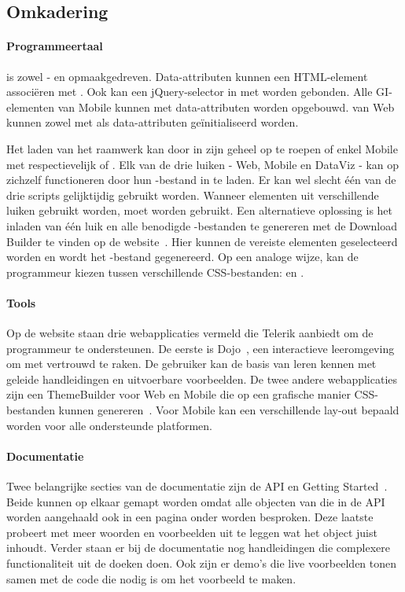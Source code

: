 \subsection{Omkadering}
\label{sec:kendo-omkadering}

\paragraph{Programmeertaal}
\kendo{} is zowel \js{}- en opmaakgedreven. 
Data-attributen kunnen een HTML-element associëren met \kendo{}.
Ook kan een jQuery-selector in \js{} met \kendo{} worden gebonden.
Alle GI-elementen van \kendo{} Mobile kunnen met data-attributen worden opgebouwd.
 van \kendo{} Web kunnen zowel met \js{} als data-attributen geïnitialiseerd worden.

Het laden van het raamwerk kan door \kendo{} in zijn geheel op te roepen of enkel \kendo{} Mobile met respectievelijk  of .
Elk van de drie luiken - Web, Mobile en DataViz - kan op zichzelf functioneren door hun \js{}-bestand in te laden.
Er kan wel slecht één van de drie scripts gelijktijdig gebruikt worden.  
Wanneer elementen uit verschillende luiken gebruikt worden, moet  worden gebruikt.
Een alternatieve oplossing is het inladen van één luik en alle benodigde \js{}-bestanden te genereren met de \js{} Download Builder te vinden op de \kendo{} website~\cite{Telerike}.
Hier kunnen de vereiste elementen geselecteerd worden en wordt het \js{}-bestand gegenereerd.
Op een analoge wijze, kan de programmeur kiezen tussen verschillende CSS-bestanden:   en .

\paragraph{Tools}
Op de \kendo{} website staan drie webapplicaties vermeld die Telerik aanbiedt om de programmeur te ondersteunen.
De eerste is \kendo{} Dojo~\cite{Telerika},  een interactieve leeromgeving om met \kendo{} vertrouwd te raken.
De gebruiker kan de basis van \kendo{} leren kennen met geleide handleidingen en uitvoerbare voorbeelden.
De twee andere webapplicaties zijn een ThemeBuilder voor Web en Mobile die op een grafische manier CSS-bestanden kunnen genereren~\cite{Telerikb,Telerikc}.
Voor \kendo{} Mobile kan een verschillende lay-out bepaald worden voor alle ondersteunde platformen.

\paragraph{Documentatie}
Twee belangrijke secties van de documentatie zijn de API en Getting Started~\cite{Telerikd}.
Beide kunnen op elkaar gemapt worden omdat alle objecten van \kendo{} die in de API worden aangehaald ook in een pagina onder  worden besproken.
Deze laatste probeert met meer woorden en voorbeelden uit te leggen wat het object juist inhoudt.
Verder staan er bij de documentatie nog handleidingen die complexere functionaliteit uit de doeken doen.
Ook zijn er demo's die live voorbeelden tonen samen met de code die nodig is om het voorbeeld te maken.

